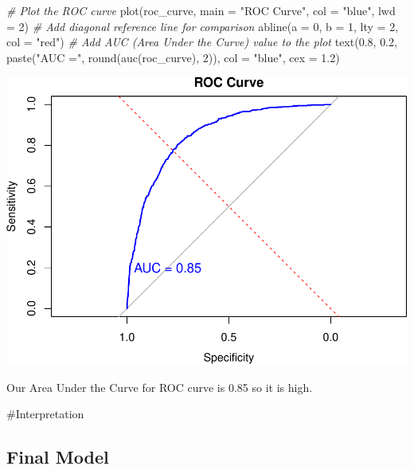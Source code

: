 \documentclass[
  twoside]{article}
\newenvironment{Shaded}{\begin{snugshade}}{\end{snugshade}}
\newcommand{\AttributeTok}[1]{\textcolor[rgb]{0.77,0.63,0.00}{#1}}
\newcommand{\CommentTok}[1]{\textcolor[rgb]{0.56,0.35,0.01}{\textit{#1}}}
\newcommand{\DecValTok}[1]{\textcolor[rgb]{0.00,0.00,0.81}{#1}}
\newcommand{\FloatTok}[1]{\textcolor[rgb]{0.00,0.00,0.81}{#1}}
\newcommand{\FunctionTok}[1]{\textcolor[rgb]{0.00,0.00,0.00}{#1}}
\newcommand{\NormalTok}[1]{#1}
\newcommand{\StringTok}[1]{\textcolor[rgb]{0.31,0.60,0.02}{#1}}
\begin{document}
\begin{Shaded}
\begin{Highlighting}[]
\CommentTok{\# Plot the ROC curve}
\FunctionTok{plot}\NormalTok{(roc\_curve, }\AttributeTok{main =} \StringTok{"ROC Curve"}\NormalTok{, }\AttributeTok{col =} \StringTok{"blue"}\NormalTok{, }\AttributeTok{lwd =} \DecValTok{2}\NormalTok{)}
\CommentTok{\# Add diagonal reference line for comparison}
\FunctionTok{abline}\NormalTok{(}\AttributeTok{a =} \DecValTok{0}\NormalTok{, }\AttributeTok{b =} \DecValTok{1}\NormalTok{, }\AttributeTok{lty =} \DecValTok{2}\NormalTok{, }\AttributeTok{col =} \StringTok{"red"}\NormalTok{)}
\CommentTok{\# Add AUC (Area Under the Curve) value to the plot}
\FunctionTok{text}\NormalTok{(}\FloatTok{0.8}\NormalTok{, }\FloatTok{0.2}\NormalTok{, }\FunctionTok{paste}\NormalTok{(}\StringTok{"AUC ="}\NormalTok{, }\FunctionTok{round}\NormalTok{(}\FunctionTok{auc}\NormalTok{(roc\_curve), }\DecValTok{2}\NormalTok{)), }\AttributeTok{col =} \StringTok{"blue"}\NormalTok{, }\AttributeTok{cex =} \FloatTok{1.2}\NormalTok{)}
\end{Highlighting}
\end{Shaded}

\includegraphics{Assigment2_files/figure-latex/unnamed-chunk-80-1.pdf}

Our Area Under the Curve for ROC curve is 0.85 so it is high.

\#Interpretation

\hypertarget{final-model}{%
\subsection{Final Model}\label{final-model}}
\end{document}
